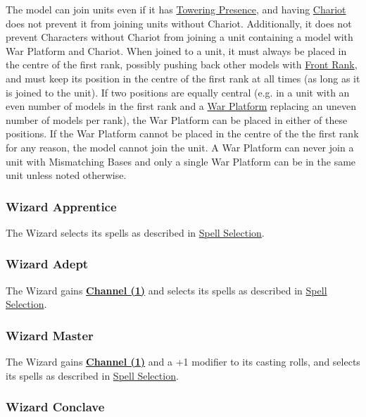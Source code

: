 The model can join units even if it has \hyperref[towering_presence]{Towering Presence}, and having \hyperref[chariot]{Chariot} does not prevent it from joining units without Chariot. Additionally, it does not prevent Characters without Chariot from joining a unit containing a model with War Platform and Chariot. When joined to a unit, it must always be placed in the centre of the first rank, possibly pushing back other models with \hyperref[front_rank]{Front Rank}, and must keep its position in the centre of the first rank at all times (as long as it is joined to the unit). If two positions are equally central (e.g. in a unit with an even number of models in the first rank and a \hyperref[war_platform]{War Platform} replacing an uneven number of models per rank), the War Platform can be placed in either of these positions. If the War Platform cannot be placed in the centre of the the first rank for any reason, the model cannot join the unit. A War Platform can never join a unit with Mismatching Bases and only a single War Platform can be in the same unit unless noted otherwise.

\subsubsection{Wizard Apprentice}
\label{wizard_apprentice}

The Wizard selects its spells as described in \hyperref[spell_selection]{Spell Selection}.

\subsubsection{Wizard Adept}
\label{wizard_adept}

The Wizard gains \hyperref[channel]{\textbf{Channel (1)}} and selects its spells as described in \hyperref[spell_selection]{Spell Selection}.

\subsubsection{Wizard Master}
\label{wizard_master}

The Wizard gains \hyperref[channel]{\textbf{Channel (1)}} and a +1 modifier to its casting rolls, and selects its spells as described in \hyperref[spell_selection]{Spell Selection}.

\subsubsection{Wizard Conclave}
\label{wizard_conclave}

